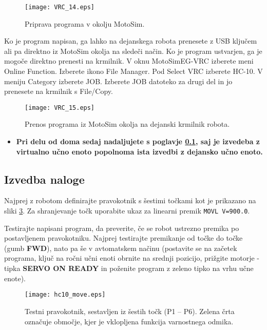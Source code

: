 \begin{figure}[hbt]
	\centering
	\texttt{[image: VRC\_14.eps]}
	\caption{Priprava programa v okolju MotoSim.}
	\label{fig:VRC_14}
\end{figure}

Ko je program napisan, ga lahko na dejanskega robota prenesete z USB ključem ali pa direktno iz MotoSim okolja na sledeči način. Ko je program ustvarjen, ga je mogoče direktno prenesti na krmilnik. V oknu MotoSimEG-VRC izberete meni Online Function. Izberete ikono File Manager. Pod Select VRC izberete HC-10. V meniju Category izberete JOB. Izberete JOB datoteko za drugi del in jo prenesete na krmilnik s File/Copy.

\begin{figure}[hbt]
	\centering
	\texttt{[image: VRC\_15.eps]}
	\caption{Prenos programa iz MotoSim okolja na dejanski krmilnik robota.}
	\label{fig:VRC_15}
\end{figure}

\begin{mdframed}[backgroundcolor=red!20, shadow=true,roundcorner=8pt]
	\begin{itemize}
		\item \textbf{Pri delu od doma sedaj nadaljujete s poglavje \ref{realni2}, saj je izvedeba z virtualno učno enoto popolnoma ista izvedbi z dejansko učno enoto.}		
	\end{itemize}
\end{mdframed}

\subsection{Izvedba naloge} \label{realni2}


Najprej z robotom definirajte pravokotnik s šestimi točkami kot je prikazano na sliki \ref{fig:hc10_move}. Za shranjevanje točk uporabite ukaz za linearni premik \verb"MOVL V=900.0".

Testirajte napisani program, da preverite, če se robot ustrezno premika po postavljenem pravokotniku. Najprej testirajte premikanje od točke do točke (gumb \textbf{FWD}), nato pa še v avtomatskem načinu (postavite se na začetek programa, ključ na ročni učni enoti obrnite na srednji pozicijo, prižgite motorje - tipka \textbf{SERVO ON READY} in poženite program z zeleno tipko na vrhu učne enote).

\begin{figure}[!hbt]
	\centering
	\texttt{[image: hc10\_move.eps]}
	\caption{Testni pravokotnik, sestavljen iz šestih točk (P1 -- P6). Zelena črta označuje območje, kjer je vklopljena funkcija varnostnega odmika. }
	\label{fig:hc10_move}
\end{figure}

